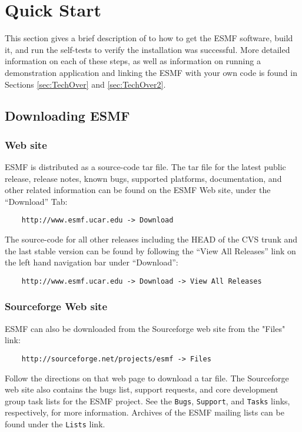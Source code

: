 \section{Quick Start}
\label{sec:QuickStart}

This section gives a brief
description of to how to get the ESMF software, build it, 
and run the self-tests to verify the installation was successful.
More detailed information on each of these steps, as well as
information on running a demonstration application and linking
the ESMF with your own code is found in Sections \ref{sec:TechOver} 
and \ref{sec:TechOver2}.  

\subsection{Downloading ESMF}
\subsubsection{Web site}
\label{sec:download}
ESMF is distributed as a source-code tar file.  The tar file for the latest
public release, release notes, 
known bugs, supported platforms, documentation, and other related information 
can be found on the ESMF Web site, under the ``Download'' Tab:
\begin{verbatim}
    http://www.esmf.ucar.edu -> Download
\end{verbatim}
The source-code for all other releases including the HEAD of the CVS trunk and the
last stable version can be found by following the ``View All Releases'' link on the
left hand navigation bar under ``Download'':
\begin{verbatim}
    http://www.esmf.ucar.edu -> Download -> View All Releases
\end{verbatim}

\subsubsection{Sourceforge Web site}
ESMF can also be downloaded from the Sourceforge web site
from the "Files" link:
\begin{verbatim}
    http://sourceforge.net/projects/esmf -> Files
\end{verbatim}
Follow the directions on that web page to download a tar file.  
The Sourceforge web site also contains 
the bugs list, support requests, and core development group task
lists for the ESMF project.
See the {\tt Bugs}, {\tt Support}, and {\tt Tasks} links, respectively,
for more information.  Archives of the ESMF mailing lists can be
found under the {\tt Lists} link.

